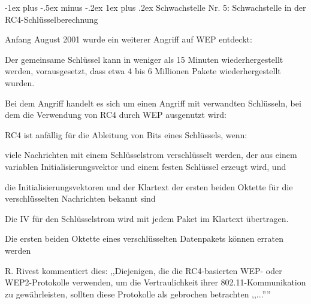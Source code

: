 \documentclass[a4paper]{article}
\makeatletter
\renewcommand{\subsubsection}{\@startsection{subsubsection}{3}{0mm}%
 {-1ex plus -.5ex minus -.2ex}%
 {1ex plus .2ex}%
 {\normalfont\small\bfseries}}
\makeatother
\begin{document}
\begin{multicols}{3}
      \subsubsection{Schwachstelle Nr. 5: Schwachstelle in der RC4-Schlüsselberechnung}
      \begin{itemize*}
            \item Anfang August 2001 wurde ein weiterer Angriff auf WEP entdeckt:
            \begin{itemize*}
                  \item Der gemeinsame Schlüssel kann in weniger als 15 Minuten wiederhergestellt werden, vorausgesetzt, dass etwa 4 bis 6 Millionen Pakete wiederhergestellt wurden.
                  \item Bei dem Angriff handelt es sich um einen Angriff mit verwandten Schlüsseln, bei dem die Verwendung von RC4 durch WEP ausgenutzt wird:
                  \begin{itemize*}
                        \item RC4 ist anfällig für die Ableitung von Bits eines Schlüssels, wenn:
                        \begin{itemize*}
                              \item viele Nachrichten mit einem Schlüsselstrom verschlüsselt werden, der aus einem variablen Initialisierungsvektor und einem festen Schlüssel erzeugt wird, und
                              \item die Initialisierungsvektoren und der Klartext der ersten beiden Oktette für die verschlüsselten Nachrichten bekannt sind
                        \end{itemize*}
                        \item Die IV für den Schlüsselstrom wird mit jedem Paket im Klartext übertragen.
                        \item Die ersten beiden Oktette eines verschlüsselten Datenpakets können erraten werden
                  \end{itemize*}
                  \item R. Rivest kommentiert dies: ,,Diejenigen, die die RC4-basierten WEP- oder WEP2-Protokolle verwenden, um die Vertraulichkeit ihrer 802.11-Kommunikation zu gewährleisten, sollten diese Protokolle als gebrochen betrachten ,,...''''
            \end{itemize*}
      \end{itemize*}


\end{multicols}
\end{document}
